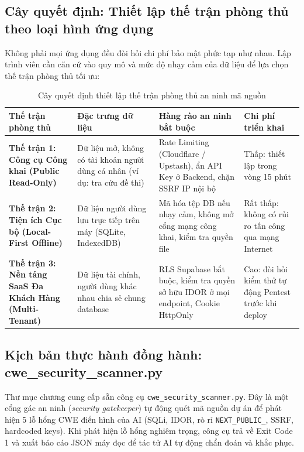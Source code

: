 \documentclass[a4paper,11pt]{article}
\begin{document}
\subsection{Cây quyết định: Thiết lập thế trận phòng thủ theo loại hình ứng dụng}

Không phải mọi ứng dụng đều đòi hỏi chi phí bảo mật phức tạp như nhau. Lập trình viên cần căn cứ vào quy mô và mức độ nhạy cảm của dữ liệu để lựa chọn thế trận phòng thủ tối ưu:

\begin{table}[htbp]
\centering
\small
\caption{Cây quyết định thiết lập thế trận phòng thủ an ninh mã nguồn}
\vspace{0.5em}
\begin{tabularx}{\textwidth}{L{3.2cm} L{3.8cm} L{4.5cm} Y}
\toprule
\textbf{Thế trận phòng thủ} & \textbf{Đặc trưng dữ liệu} & \textbf{Hàng rào an ninh bắt buộc} & \textbf{Chi phí triển khai} \\
\midrule
\textbf{Thế trận 1: Công cụ Công khai (Public Read-Only)} & Dữ liệu mở, không có tài khoản người dùng cá nhân (ví dụ: tra cứu đề thi) & Rate Limiting (Cloudflare / Upstash), ẩn API Key ở Backend, chặn SSRF IP nội bộ & Thấp: thiết lập trong vòng 15 phút \\
\textbf{Thế trận 2: Tiện ích Cục bộ (Local-First Offline)} & Dữ liệu người dùng lưu trực tiếp trên máy (SQLite, IndexedDB) & Mã hóa tệp DB nếu nhạy cảm, không mở cổng mạng công khai, kiểm tra quyền file & Rất thấp: không có rủi ro tấn công qua mạng Internet \\
\textbf{Thế trận 3: Nền tảng SaaS Đa Khách Hàng (Multi-Tenant)} & Dữ liệu tài chính, người dùng khác nhau chia sẻ chung database & RLS Supabase bắt buộc, kiểm tra quyền sở hữu IDOR ở mọi endpoint, Cookie HttpOnly & Cao: đòi hỏi kiểm thử tự động Pentest trước khi deploy \\
\bottomrule
\end{tabularx}
\end{table}

\subsection{Kịch bản thực hành đồng hành: cwe\_security\_scanner.py}
Thư mục chương cung cấp sẵn công cụ \texttt{cwe\_security\_scanner.py}. Đây là một cổng gác an ninh (\textit{security gatekeeper}) tự động quét mã nguồn dự án để phát hiện 5 lỗ hổng CWE điển hình của AI (SQLi, IDOR, rò rỉ \texttt{NEXT\_PUBLIC\_}, SSRF, hardcoded keys). Khi phát hiện lỗ hổng nghiêm trọng, công cụ trả về Exit Code 1 và xuất báo cáo JSON máy đọc để tác tử AI tự động chẩn đoán và khắc phục.
\end{document}
